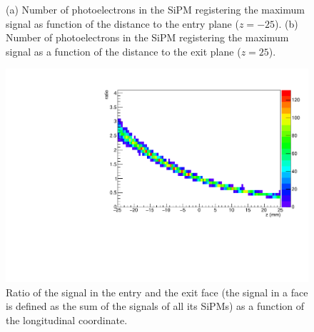 \begin{figure}[!htb]
	\centering
	\caption{\label{fig.sipmm} (a) Number of photoelectrons in the SiPM registering the maximum signal as function of the distance to the entry plane ($z=-25$). (b) Number of photoelectrons in the SiPM registering the maximum signal as a function of the distance to the exit plane ($z=25$).}
\end{figure}

\begin{figure}[!htb]
	\centering
	\includegraphics[scale=0.5]{img/zratio.pdf}
	\caption{\label{fig.zratio}  Ratio of the signal in the entry and the exit face (the signal in a face is defined as the sum of the signals of all its SiPMs) as a function of the longitudinal coordinate.}
\end{figure}

